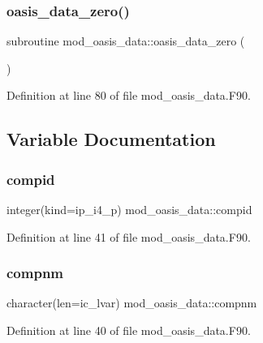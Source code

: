 \subsubsection{\texorpdfstring{oasis\+\_\+data\+\_\+zero()}{oasis\_data\_zero()}}
{\footnotesize\ttfamily subroutine mod\+\_\+oasis\+\_\+data\+::oasis\+\_\+data\+\_\+zero (\begin{DoxyParamCaption}{ }\end{DoxyParamCaption})}



Definition at line 80 of file mod\+\_\+oasis\+\_\+data.\+F90.



\subsection{Variable Documentation}
\mbox{\label{namespacemod__oasis__data_ab53c9f7676f84fdf1050cea5efcd3e7f}} 
\subsubsection{\texorpdfstring{compid}{compid}}
{\footnotesize\ttfamily integer(kind=ip\+\_\+i4\+\_\+p) mod\+\_\+oasis\+\_\+data\+::compid}



Definition at line 41 of file mod\+\_\+oasis\+\_\+data.\+F90.

\mbox{\label{namespacemod__oasis__data_a8379835615758ccf7a4287dde5785681}} 
\subsubsection{\texorpdfstring{compnm}{compnm}}
{\footnotesize\ttfamily character(len=ic\+\_\+lvar) mod\+\_\+oasis\+\_\+data\+::compnm}



Definition at line 40 of file mod\+\_\+oasis\+\_\+data.\+F90.

\mbox{\label{namespacemod__oasis__data_acfb160b3d147e7cb667b0dc0f5bb2960}} 
